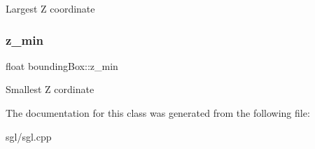 Largest Z coordinate \mbox{\label{classbounding_box_a6204bf950a9f8191a3e1ef6a2afcc3d0}} 
\subsubsection{\texorpdfstring{z\+\_\+min}{z\_min}}
{\footnotesize\ttfamily float bounding\+Box\+::z\+\_\+min}

Smallest Z cordinate 

The documentation for this class was generated from the following file\+:\begin{DoxyCompactItemize}
\item 
sgl/sgl.\+cpp\end{DoxyCompactItemize}
